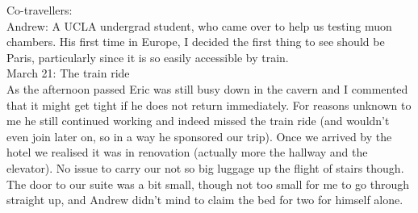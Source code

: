 Co-travellers:\\
Andrew: A UCLA undergrad student, who came over to help us testing muon chambers. His first time in Europe, I decided the first thing to see should be Paris, particularly since it is so easily accessible by train.\\

March 21: The train ride\\
As the afternoon passed Eric was still busy down in the cavern and I commented that it might get tight if he does not return immediately. For reasons unknown to me he still continued working and indeed missed the train ride (and wouldn't even join later on, so in a way he sponsored our trip). Once we arrived by the hotel we realised it was in renovation (actually more the hallway and the elevator). No issue to carry our not so big luggage up the flight of stairs though. The door to our suite was a bit small, though not too small for me to go through straight up, and Andrew didn't mind to claim the bed for two for himself alone.\\

